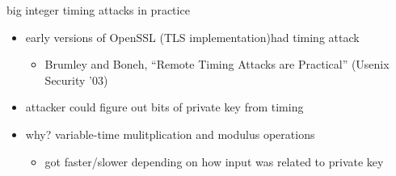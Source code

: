\begin{frame}{big integer timing attacks in practice}
    \begin{itemize}
    \item early versions of OpenSSL (TLS implementation)had timing attack
        \begin{itemize}
        \item Brumley and Boneh, ``Remote Timing Attacks are Practical'' (Usenix Security '03)
        \end{itemize}
    \item attacker could figure out bits of private key from timing
    \vspace{.5cm}
    \item why? variable-time mulitplication and modulus operations 
        \begin{itemize}
        \item got faster/slower depending on how input was related to private key
        \end{itemize}
    \end{itemize}
\end{frame}
